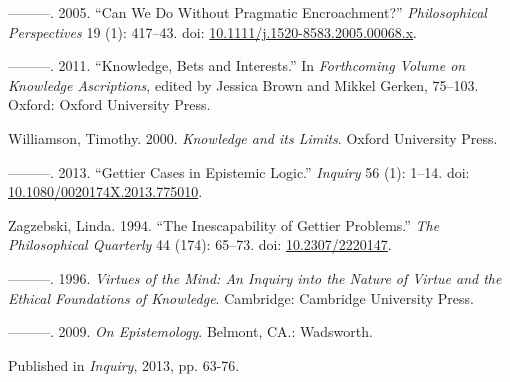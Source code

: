\documentclass[
  11pt,
  letterpaper,
  DIV=11,
  numbers=noendperiod,
  twoside]{scrartcl}
\newlength{\cslhangindent}
\newenvironment{CSLReferences}[2] %
 {\begin{list}{}{%
  \setlength{\itemindent}{0pt}
  \setlength{\leftmargin}{0pt}
  \setlength{\parsep}{0pt}
  \ifodd #1
   \setlength{\leftmargin}{\cslhangindent}
   \setlength{\itemindent}{-1\cslhangindent}
  \fi
  \setlength{\itemsep}{#2\baselineskip}}}
 {\end{list}}
\begin{document}
\begin{CSLReferences}{1}{0}
---------. 2005. {``{Can We Do Without Pragmatic Encroachment?}''}
\emph{Philosophical Perspectives} 19 (1): 417--43. doi:
\href{https://doi.org/10.1111/j.1520-8583.2005.00068.x}{10.1111/j.1520-8583.2005.00068.x}.

---------. 2011. {``Knowledge, Bets and Interests.''} In
\emph{Forthcoming Volume on Knowledge Ascriptions}, edited by Jessica
Brown and Mikkel Gerken, 75--103. Oxford: Oxford University Press.

Williamson, Timothy. 2000. \emph{{Knowledge and its Limits}}. Oxford
University Press.

---------. 2013. {``Gettier Cases in Epistemic Logic.''} \emph{Inquiry}
56 (1): 1--14. doi:
\href{https://doi.org/10.1080/0020174X.2013.775010}{10.1080/0020174X.2013.775010}.

Zagzebski, Linda. 1994. {``The Inescapability of Gettier Problems.''}
\emph{The Philosophical Quarterly} 44 (174): 65--73. doi:
\href{https://doi.org/10.2307/2220147}{10.2307/2220147}.

---------. 1996. \emph{Virtues of the Mind: An Inquiry into the Nature
of Virtue and the Ethical Foundations of Knowledge}. Cambridge:
Cambridge University Press.

---------. 2009. \emph{On Epistemology}. Belmont, CA.: Wadsworth.

\end{CSLReferences}



\noindent Published in\emph{
Inquiry}, 2013, pp. 63-76.
\end{document}
